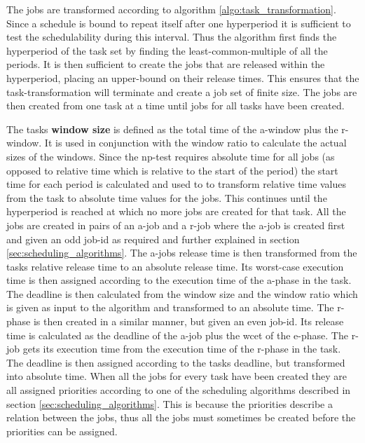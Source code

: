 \documentclass{kththesis}
\begin{document}
The jobs are transformed according to algorithm \ref{algo:task_transformation}. Since a schedule is
bound to repeat itself after one hyperperiod it is sufficient to test the schedulability during this
interval. Thus the algorithm first finds the hyperperiod of the task set by finding the
least-common-multiple of all the periods. It is then sufficient to create the jobs that are released
within the hyperperiod, placing an upper-bound on their release times. This ensures that the
task-transformation will terminate and create a job set of finite size. The jobs are then created
from one task at a time until jobs for all tasks have been created. 

The tasks \textbf{window size} is defined as the total time of the \acrshort{a}-window plus the
\acrshort{r}-window. It is used in conjunction with the window ratio to calculate the actual sizes
of the windows. Since the \acrshort{np}-test requires absolute time for all jobs (as opposed to relative time
which is relative to the start of the period) the start time for each period is calculated and used
to to transform relative time values from the task to absolute time values for the jobs. This continues until the hyperperiod is
reached at which no more jobs are created for that task. All the jobs are created in pairs of
an \acrshort{a}-job and a \acrshort{r}-job where the \acrshort{a}-job is created first and given an odd
job-id as required and further explained in section \ref{sec:scheduling_algorithms}. The
\acrshort{a}-jobs release
time is then transformed from the tasks relative release time to an absolute release time. Its
worst-case execution time is then assigned according to the execution time of the \acrshort{a}-phase
in the task. The deadline is then calculated from the window size and the window ratio which is
given as input to the algorithm and transformed to an absolute time. The \acrshort{r}-phase is then
created in a similar manner, but given an even job-id. Its release time is calculated as the
deadline of the \acrshort{a}-job plus the \acrshort{wcet} of the \acrshort{e}-phase. The
\acrshort{r}-job gets its execution time from the execution time of the \acrshort{r}-phase in the
task. The deadline is then assigned according to the tasks deadline, but transformed into absolute
time. When all the jobs for every task have been created they are all assigned priorities according
to one of the scheduling algorithms described in section \ref{sec:scheduling_algorithms}. This
is because the priorities describe a relation between the jobs, thus all the jobs must sometimes be
created before the priorities can be assigned. 
\end{document}
